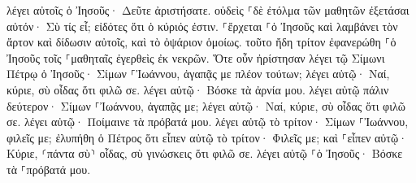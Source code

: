 \documentclass{openreader}
\begin{document}
λέγει αὐτοῖς ὁ Ἰησοῦς· Δεῦτε ἀριστήσατε. οὐδεὶς ⸀δὲ ἐτόλμα τῶν μαθητῶν ἐξετάσαι αὐτόν· Σὺ τίς εἶ; εἰδότες ὅτι ὁ κύριός ἐστιν. 
⸀ἔρχεται ⸀ὁ Ἰησοῦς καὶ λαμβάνει τὸν ἄρτον καὶ δίδωσιν αὐτοῖς, καὶ τὸ ὀψάριον ὁμοίως. 
τοῦτο ἤδη τρίτον ἐφανερώθη ⸀ὁ Ἰησοῦς τοῖς ⸀μαθηταῖς ἐγερθεὶς ἐκ νεκρῶν. 
Ὅτε οὖν ἠρίστησαν λέγει τῷ Σίμωνι Πέτρῳ ὁ Ἰησοῦς· Σίμων ⸀Ἰωάννου, ἀγαπᾷς με πλέον τούτων; λέγει αὐτῷ· Ναί, κύριε, σὺ οἶδας ὅτι φιλῶ σε. λέγει αὐτῷ· Βόσκε τὰ ἀρνία μου. 
λέγει αὐτῷ πάλιν δεύτερον· Σίμων ⸀Ἰωάννου, ἀγαπᾷς με; λέγει αὐτῷ· Ναί, κύριε, σὺ οἶδας ὅτι φιλῶ σε. λέγει αὐτῷ· Ποίμαινε τὰ πρόβατά μου. 
λέγει αὐτῷ τὸ τρίτον· Σίμων ⸀Ἰωάννου, φιλεῖς με; ἐλυπήθη ὁ Πέτρος ὅτι εἶπεν αὐτῷ τὸ τρίτον· Φιλεῖς με; καὶ ⸀εἶπεν αὐτῷ· Κύριε, ⸂πάντα σὺ⸃ οἶδας, σὺ γινώσκεις ὅτι φιλῶ σε. λέγει αὐτῷ ⸀ὁ Ἰησοῦς· Βόσκε τὰ ⸀πρόβατά μου. 
\end{document}
